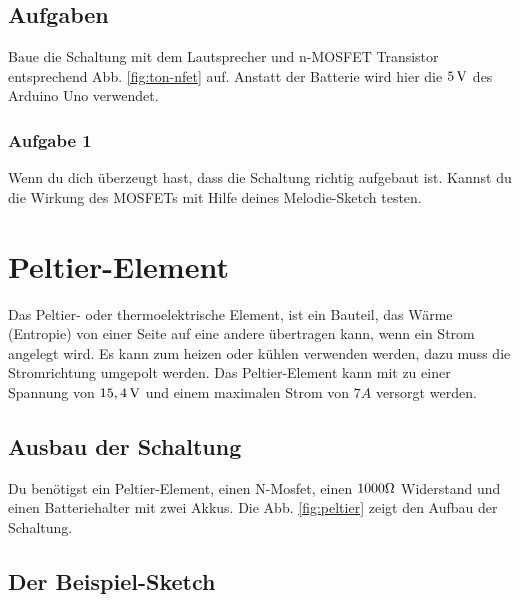 \subsection{Aufgaben}
Baue die Schaltung mit dem Lautsprecher und n-MOSFET Transistor entsprechend Abb. \ref{fig:ton-nfet} auf.
 Anstatt der Batterie wird hier die $5\operatorname{V}$ des Arduino Uno verwendet.   
 
\subsubsection{Aufgabe 1}
Wenn du dich überzeugt hast, dass die Schaltung richtig aufgebaut ist. Kannst du die Wirkung des MOSFETs mit Hilfe deines Melodie-Sketch testen.

\clearpage
\section{Peltier-Element}

Das Peltier- oder thermoelektrische Element, ist  ein Bauteil, das Wärme (Entropie) von einer Seite auf eine andere übertragen kann, wenn ein Strom angelegt wird. Es kann zum heizen oder  kühlen verwenden werden, dazu muss die Stromrichtung umgepolt werden. Das Peltier-Element kann mit zu einer Spannung von $15,4\operatorname{V}$ und einem maximalen Strom von $7A$ versorgt werden.


\subsection{Ausbau der Schaltung}

Du benötigst ein Peltier-Element, einen N-Mosfet,
einen $1000\Omega$ Widerstand und einen Batteriehalter mit zwei Akkus. Die Abb. \ref{fig:peltier} zeigt den Aufbau der Schaltung.   

\subsection{Der Beispiel-Sketch}


